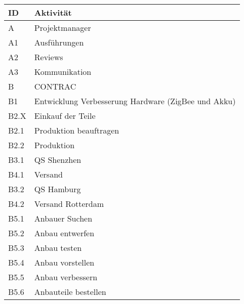 \begin{table}[H]
    \renewcommand{\arraystretch}{1.05}
    \begin{center}
        \begin{tabular}{l|l}
            \hline
            \textbf{ID} & \textbf{Aktivität}\\\hline
            A    & Projektmanager                                      \\ \hline
            A1   & Ausführungen                                        \\ \hline
            A2   & Reviews                                             \\ \hline
            A3 & Kommunikation \\\hline
            B    & CONTRAC                                             \\ \hline
            B1   & Entwicklung Verbesserung Hardware (ZigBee und Akku) \\ \hline
            B2.X & Einkauf der Teile\\\hline
            B2.1 & Produktion beauftragen                              \\ \hline
            B2.2 & Produktion                                          \\ \hline
            B3.1 & QS Shenzhen                                         \\ \hline
            B4.1 & Versand                                             \\ \hline
            B3.2 & QS Hamburg                                          \\ \hline
            B4.2 & Versand Rotterdam                                   \\ \hline
            B5.1 & Anbauer Suchen                                      \\ \hline
            B5.2 & Anbau entwerfen                                     \\ \hline
            B5.3 & Anbau testen                                        \\ \hline
            B5.4 & Anbau vorstellen                                    \\ \hline
            B5.5 & Anbau verbessern                                    \\ \hline
            B5.6 & Anbauteile bestellen                                \\ \hline

\end{tabular}
\end{center}
\end{table}
